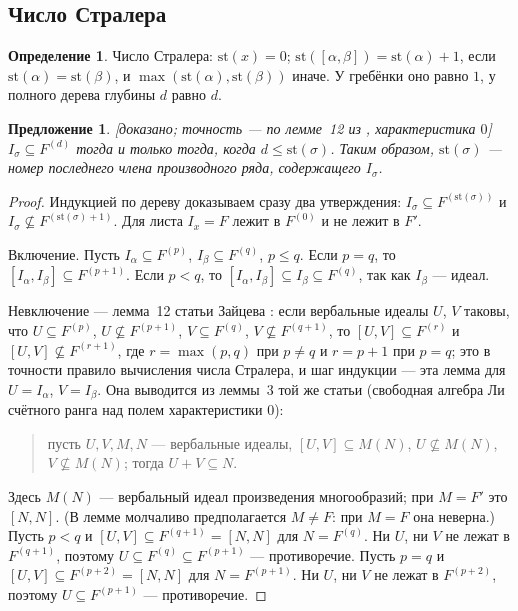 \documentclass[11pt]{article}
\newcommand{\st}{\mathrm{st}}
\newcommand{\stat}[1]{\textsf{\small[#1]}}
\theoremstyle{plain}
\newtheorem{proposition}[theorem]{Предложение}
\theoremstyle{definition}
\newtheorem{definition}[theorem]{Определение}
\theoremstyle{remark}
\begin{document}
\subsection{Число Стралера}

\begin{definition}
Число Стралера: $\st(x)=0$; $\st([\alpha,\beta])=\st(\alpha)+1$, если $\st(\alpha)=\st(\beta)$, и $\max(\st(\alpha),\st(\beta))$ иначе. У гребёнки оно равно $1$, у полного дерева глубины $d$ равно $d$.
\end{definition}

\begin{proposition}\label{prop:strahler} \stat{доказано; точность --- по лемме~12 из \cite{Z81}, характеристика $0$}
$I_\sigma\subseteq F^{(d)}$ тогда и только тогда, когда $d\le\st(\sigma)$. Таким образом, $\st(\sigma)$ --- номер последнего члена производного ряда, содержащего $I_\sigma$.
\end{proposition}
\begin{proof}
Индукцией по дереву доказываем сразу два утверждения: $I_\sigma\subseteq F^{(\st(\sigma))}$ и $I_\sigma\not\subseteq F^{(\st(\sigma)+1)}$. Для листа $I_x=F$ лежит в $F^{(0)}$ и не лежит в $F'$.

Включение. Пусть $I_\alpha\subseteq F^{(p)}$, $I_\beta\subseteq F^{(q)}$, $p\le q$. Если $p=q$, то $[I_\alpha,I_\beta]\subseteq F^{(p+1)}$. Если $p<q$, то $[I_\alpha,I_\beta]\subseteq I_\beta\subseteq F^{(q)}$, так как $I_\beta$ --- идеал.

Невключение --- лемма~12 статьи Зайцева \cite{Z81}: если вербальные идеалы $U$, $V$ таковы, что $U\subseteq F^{(p)}$, $U\not\subseteq F^{(p+1)}$, $V\subseteq F^{(q)}$, $V\not\subseteq F^{(q+1)}$, то $[U,V]\subseteq F^{(r)}$ и $[U,V]\not\subseteq F^{(r+1)}$, где $r=\max(p,q)$ при $p\ne q$ и $r=p+1$ при $p=q$; это в точности правило вычисления числа Стралера, и шаг индукции --- эта лемма для $U=I_\alpha$, $V=I_\beta$. Она выводится из леммы~3 той же статьи (свободная алгебра Ли счётного ранга над полем характеристики $0$):
\begin{quote}
пусть $U,V,M,N$ --- вербальные идеалы, $[U,V]\subseteq M(N)$, $U\not\subseteq M(N)$, $V\not\subseteq M(N)$; тогда $U+V\subseteq N$.
\end{quote}
Здесь $M(N)$ --- вербальный идеал произведения многообразий; при $M=F'$ это $[N,N]$. (В лемме молчаливо предполагается $M\ne F$: при $M=F$ она неверна.) Пусть $p<q$ и $[U,V]\subseteq F^{(q+1)}=[N,N]$ для $N=F^{(q)}$. Ни $U$, ни $V$ не лежат в $F^{(q+1)}$, поэтому $U\subseteq F^{(q)}\subseteq F^{(p+1)}$ --- противоречие. Пусть $p=q$ и $[U,V]\subseteq F^{(p+2)}=[N,N]$ для $N=F^{(p+1)}$. Ни $U$, ни $V$ не лежат в $F^{(p+2)}$, поэтому $U\subseteq F^{(p+1)}$ --- противоречие.
\end{proof}
\end{document}
